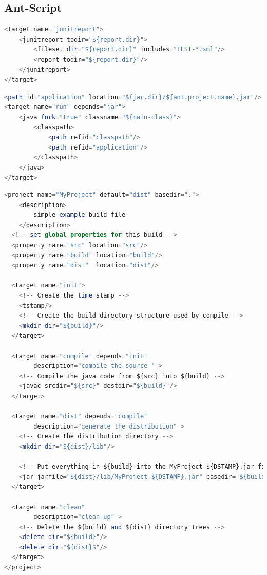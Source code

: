 \documentclass[a4paper,10pt]{article}
\begin{document}
\subsection{Ant-Script}

\begin{lstlisting}[language=Octave, label=Ant script, caption=Ant Script 2a, style=MyAntStyle]
<target name="junitreport">
    <junitreport todir="${report.dir}">
        <fileset dir="${report.dir}" includes="TEST-*.xml"/>
        <report todir="${report.dir}"/>
    </junitreport>
</target>
\end{lstlisting}
\begin{lstlisting}[language=Octave, label=Ant script, caption=Ant Script 2b, style=MyAntStyle]
<path id="application" location="${jar.dir}/${ant.project.name}.jar"/>
<target name="run" depends="jar">
    <java fork="true" classname="${main-class}">
        <classpath>
            <path refid="classpath"/>
            <path refid="application"/>
        </classpath>
    </java>
</target>
\end{lstlisting}
\begin{lstlisting}[language=Octave, label=Ant script, caption=Ant Script 2c, style=MyAntStyle]
 <project name="MyProject" default="dist" basedir=".">
    <description>
        simple example build file
    </description>
  <!-- set global properties for this build -->
  <property name="src" location="src"/>
  <property name="build" location="build"/>
  <property name="dist"  location="dist"/>

  <target name="init">
    <!-- Create the time stamp -->
    <tstamp/>
    <!-- Create the build directory structure used by compile -->
    <mkdir dir="${build}"/>
  </target>

  <target name="compile" depends="init"
        description="compile the source " >
    <!-- Compile the java code from ${src} into ${build} -->
    <javac srcdir="${src}" destdir="${build}"/>
  </target>

  <target name="dist" depends="compile"
        description="generate the distribution" >
    <!-- Create the distribution directory -->
    <mkdir dir="${dist}/lib"/>

    <!-- Put everything in ${build} into the MyProject-${DSTAMP}.jar file -->
    <jar jarfile="${dist}/lib/MyProject-${DSTAMP}.jar" basedir="${build}"/>
  </target>

  <target name="clean"
        description="clean up" >
    <!-- Delete the ${build} and ${dist} directory trees -->
    <delete dir="${build}"/>
    <delete dir="${dist}$"/>
  </target>
</project>
\end{lstlisting}
\end{document}

